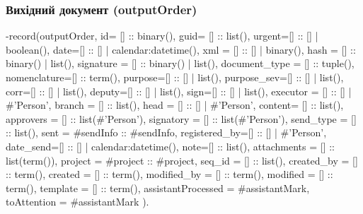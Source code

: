 \documentclass{article}
\let\originalfootnotesize\footnotesize
\let\oldverbatim\verbatim
\let\oldendverbatim\endverbatim
\renewenvironment{verbatim}{\originalfootnotesize\oldverbatim}{\oldendverbatim}
\begin{document}
\subsubsection{Вихідний документ (outputOrder)}
\begin{verbatim}
-record(outputOrder, { id= [] :: binary(),
                       guid= [] :: list(),
                       urgent=[] :: [] | boolean(),
                       date=[] :: [] | calendar:datetime(),
                       xml = [] :: [] | binary(),
                       hash = [] :: binary() | list(),
                       signature = [] :: binary() | list(),
                       document_type = [] :: tuple(),
                       nomenclature=[] :: term(),
                       purpose=[] :: [] | list(),
                       purpose_sev=[] :: [] | list(),
                       corr=[] :: [] | list(),
                       deputy=[] :: [] | list(),
                       sign=[] :: [] | list(),
                       executor = [] :: [] | #'Person'{},
                       branch = [] :: list(),
                       head = [] :: [] | #'Person'{},
                       content= [] :: list(),
                       approvers = [] :: list(#'Person'{}),
                       signatory = [] :: list(#'Person'{}),
                       send_type = [] :: list(),
                       sent = #sendInfo{} :: #sendInfo{},
                       registered_by=[] :: [] | #'Person'{},
                       date_send=[] :: [] | calendar:datetime(),
                       note=[] :: list(),
                       attachments = [] :: list(term()),
                       project = #project{} :: #project{},
                       seq_id = [] :: list(),
                       created_by = [] :: term(),
                       created = [] :: term(),
                       modified_by = [] :: term(),
                       modified = [] :: term(),
                       template = [] :: term(),
                       assistantProcessed = #assistantMark{},
                       toAttention = #assistantMark{}
              }).
\end{verbatim}
\end{document}
